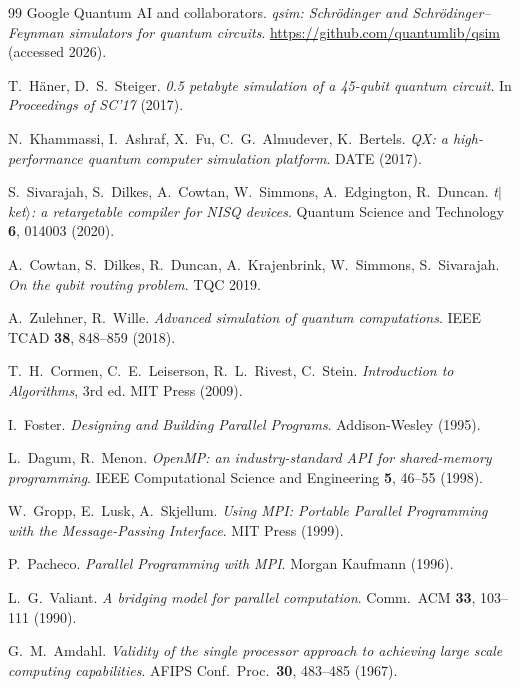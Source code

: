 \documentclass[11pt,a4paper]{article}
\begin{document}
\begin{thebibliography}{99}
  Google Quantum AI and collaborators.
  \textit{qsim: Schr\"odinger and Schr\"odinger--Feynman simulators for quantum
  circuits}.
  \url{https://github.com/quantumlib/qsim} (accessed 2026).

  T.~H\"aner, D.~S.~Steiger.
  \textit{0.5 petabyte simulation of a 45-qubit quantum circuit}.
  In \emph{Proceedings of SC'17} (2017).

  N.~Khammassi, I.~Ashraf, X.~Fu, C.~G.~Almudever, K.~Bertels.
  \textit{QX: a high-performance quantum computer simulation platform}.
  DATE (2017).

  S.~Sivarajah, S.~Dilkes, A.~Cowtan, W.~Simmons, A.~Edgington, R.~Duncan.
  \textit{t$|$ket$\rangle$: a retargetable compiler for NISQ devices}.
  Quantum Science and Technology \textbf{6}, 014003 (2020).

  A.~Cowtan, S.~Dilkes, R.~Duncan, A.~Krajenbrink, W.~Simmons, S.~Sivarajah.
  \textit{On the qubit routing problem}. TQC 2019.

  A.~Zulehner, R.~Wille.
  \textit{Advanced simulation of quantum computations}.
  IEEE TCAD \textbf{38}, 848--859 (2018).

  T.~H.~Cormen, C.~E.~Leiserson, R.~L.~Rivest, C.~Stein.
  \textit{Introduction to Algorithms}, 3rd ed. MIT Press (2009).

  I.~Foster.
  \textit{Designing and Building Parallel Programs}. Addison-Wesley (1995).

  L.~Dagum, R.~Menon.
  \textit{OpenMP: an industry-standard API for shared-memory programming}.
  IEEE Computational Science and Engineering \textbf{5}, 46--55 (1998).

  W.~Gropp, E.~Lusk, A.~Skjellum.
  \textit{Using MPI: Portable Parallel Programming with the Message-Passing
  Interface}. MIT Press (1999).

  P.~Pacheco.
  \textit{Parallel Programming with MPI}. Morgan Kaufmann (1996).

  L.~G.~Valiant.
  \textit{A bridging model for parallel computation}.
  Comm.\ ACM \textbf{33}, 103--111 (1990).

  G.~M.~Amdahl.
  \textit{Validity of the single processor approach to achieving large scale
  computing capabilities}. AFIPS Conf.\ Proc.\ \textbf{30}, 483--485 (1967).


\end{thebibliography}
\end{document}
